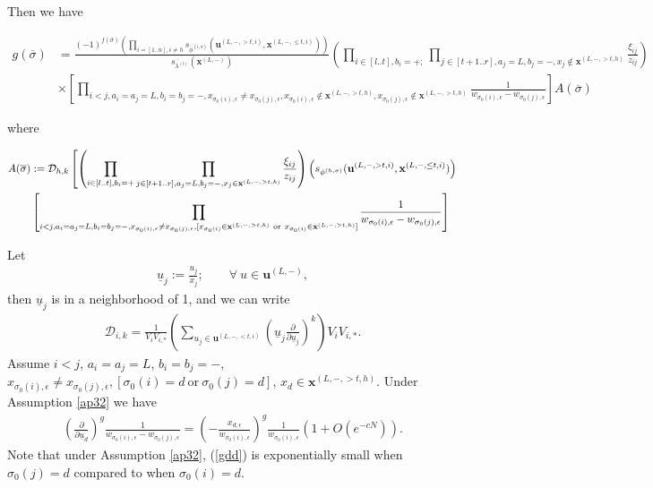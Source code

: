 \documentclass[11pt]{amsart}
\theoremstyle{plain}
\theoremstyle{definition}
\theoremstyle{remark}
\newcommand\ol{\overline}
\newcommand\si{\sigma}
\numberwithin{equation}{section}
\numberwithin{theorem}{section}
\numberwithin{figure}{section}
\begin{document}
Then we have
\begin{small}
\begin{align*}
g(\ol{\si})&=\frac{(-1)^{f(\ol{\si})}\left(\prod_{i=[1..n],i\neq h}s_{\phi^{(i,\sigma)}}(\mathbf{u}^{(L,-,>t,i)},\mathbf{x}^{(L,-,\leq t,i)})\right)}{s_{\lambda^{(l)}}(\mathbf{x}^{(L,-)})}\left(\prod_{i\in[l..t],b_i=+;}
\prod_{j\in[t+1..r],a_j=L,b_j=-,x_j\notin \mathbf{x}^{(L,-,>t,h)}}\frac{\xi_{ij}}{z_{ij}}\right)\\
&\times\left[\prod_{i<j,a_i=a_j=L,b_i=b_j=-,x_{\si_0(i),\epsilon}\neq x_{\si_0(j),\epsilon},x_{\si_0(i),\epsilon}\notin \mathbf{x}^{(L,-,>t,h)},x_{\si_0(j),\epsilon}\notin \mathbf{x}^{(L,-,>t,h)}}\frac{1}{w_{\si_0(i),\epsilon}-w_{\si_0(j),\epsilon}}\right]A(\ol{\si})
\end{align*}
\end{small}
where
\begin{small}
\begin{align*}
A(\ol{\si})&:=\mathcal{D}_{h,k} \left[\left(\prod_{i\in[l..t],b_i=+}
\prod_{j\in[t+1..r],a_j=L,b_j=-,x_j\in \mathbf{x}^{(L,-,>t,h)}}\frac{\xi_{ij}}{z_{ij}}\right)\left(s_{\phi^{(h,\sigma)}}(\mathbf{u}^{(L,-,>t,i)},\mathbf{x}^{(L,-,\leq t,i)})
\right)\right.\\
\notag&\left[\prod_{i<j,a_i=a_j=L,b_i=b_j=-,x_{\si_0(i),\epsilon}\neq x_{\si_0(j),\epsilon},[x_{\si_0(i)}\in \mathbf{x}^{(L,-,>t,h)} \ \mathrm{or}\ x_{\si_0(i)}\in \mathbf{x}^{(L,-,>t,h)}]}\frac{1}{w_{\si_0(i),\epsilon}-w_{\si_0(j),\epsilon}}\right]
\end{align*}
\end{small}
Let 
\begin{align*}
\underline{u}_j:=\frac{u_j}{x_j};\qquad\forall\ u\in \mathbf{u}^{(L,-)},
\end{align*}
then $\underline{u}_j$ is in a neighborhood of 1, and we can write
\begin{align*}
\mathcal{D}_{i,k} =\frac{1}{V_iV_{i,*}}\left(\sum_{u_j\in\mathbf{u}^{(L,-,<t,i)}}\left(\underline{u}_j\frac{\partial}{\partial
\underline{u}_j}\right)^k\right)V_iV_{i,*}.
\end{align*}
Assume $i<j$, $a_i=a_j=L$, $b_i=b_j=-$, $x_{\si_0(i),\epsilon}\neq x_{\si_0(j),\epsilon},[\si_0(i)=d \ \mathrm{or}\ \si_0(j)=d]$, $x_d\in \mathbf{x}^{(L,-,>t,h)}$.
Under Assumption \ref{ap32} we have
\begin{align}
\left(\frac{\partial}{\partial\underline{u}_d}\right)^{g}\frac{1}{w_{\si_0(i),\epsilon}-w_{\si_0(j),\epsilon}}=\left(-\frac{x_{d,\epsilon}}{w_{\si_0(i),\epsilon}}\right)^g\frac{1}{w_{\si_0(i),\epsilon}}\left(1+O(e^{-cN})\right).\label{gdd}
\end{align}
Note that under Assumption \ref{ap32}, (\ref{gdd}) is exponentially small when $\si_0(j)=d$ compared to when 
$\si_0(i)=d$.
\end{document}
